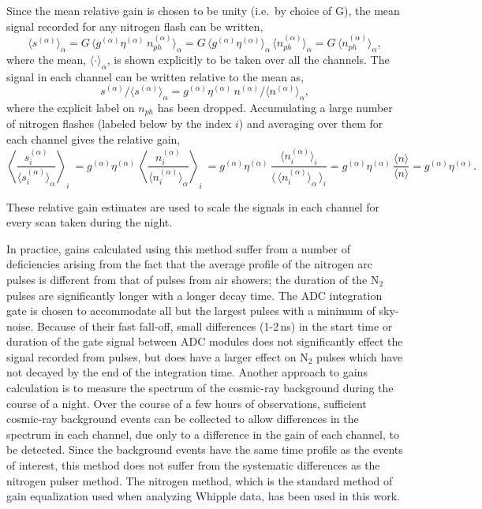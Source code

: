 Since the mean relative gain is chosen to be unity (i.e.\ by choice of G),
the mean signal recorded for any nitrogen flash can be written,
\[\langle s^{(\alpha)}\rangle_\alpha = G\,\langle g^{(\alpha)}\eta^{(\alpha)}\,n_{ph}^{(\alpha)}\rangle_\alpha = G\,\langle g^{(\alpha)}\eta^{(\alpha)}\rangle_\alpha\,\langle n_{ph}^{(\alpha)}\rangle_\alpha = G\,\langle n_{ph}^{(\alpha)}\rangle_\alpha,\]
where the mean, $\langle\cdot\rangle_\alpha$, is shown explicitly to
be taken over all the channels. The signal in each channel can be
written relative to the mean as,
\[s^{(\alpha)}/\langle s^{(\alpha)}\rangle_\alpha =
g^{(\alpha)}\eta^{(\alpha)}\,n^{(\alpha)}/\langle n^{(\alpha)}\rangle_\alpha,\]
where the explicit label on $n_{ph}$ has been dropped. Accumulating a
large number of nitrogen flashes (labeled below by the index $i$) and
averaging over them for each channel gives the relative gain,
\[\left\langle\frac{s^{(\alpha)}_i}{\langle s^{(\alpha)}_i\rangle_\alpha}\right\rangle_i\ = 
g^{(\alpha)}\eta^{(\alpha)}\,\left\langle \frac{n^{(\alpha)}_i}{\langle n^{(\alpha)}_i\rangle_\alpha}\right\rangle_i\ =  
g^{(\alpha)}\eta^{(\alpha)}\,\frac{\langle n^{(\alpha)}_i\rangle_i}{\langle\,\langle n^{(\alpha)}_i\rangle_\alpha\,\rangle_i} =
g^{(\alpha)}\eta^{(\alpha)}\,\frac{\langle n\rangle}{\langle n\rangle} = g^{(\alpha)}\eta^{(\alpha)}.\]

These relative gain estimates are used to scale the signals in each
channel for every scan taken during the night.

In practice, gains calculated using this method suffer from a number
of deficiencies arising from the fact that the average profile of the
nitrogen arc pulses is different from that of \Cerenkov pulses from
air showers; the duration of the N$_2$ pulses are significantly longer
with a longer decay time. The ADC integration gate is chosen to
accommodate all but the largest \Cerenkov pulses with a minimum of
sky-noise. Because of their fast fall-off, small differences (1-2\,ns)
in the start time or duration of the gate signal between ADC modules
does not significantly effect the signal recorded from \Cerenkov
pulses, but does have a larger effect on N$_2$ pulses which have not
decayed by the end of the integration time. Another approach to gains
calculation is to measure the spectrum of the cosmic-ray background
during the course of a night. Over the course of a few hours of
observations, sufficient cosmic-ray background events can be collected
to allow differences in the spectrum in each channel, due only to a
difference in the gain of each channel, to be detected. Since the
background events have the same time profile as the \Gray events of
interest, this method does not suffer from the systematic differences
as the nitrogen pulser method. The nitrogen method, which is the
standard method of gain equalization used when analyzing Whipple data,
has been used in this work.

